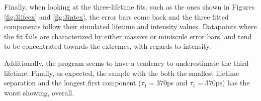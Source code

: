 Finally, when looking at the three-lifetime fits, such as the ones shown in Figures \ref{fig:3lifeex} and \ref{fig:3intex}, the error bars come back and the three fitted components follow their simulated lifetime and intensity values. Datapoints where the fit fails are characterized by either massive or miniscule error bars, and tend to be concentrated towards the extremes, with regards to intensity. 

Additionally, the program seems to have a tendency to underestimate the third lifetime. Finally, as expected, the sample with the both the smallest lifetime separation and the longest first component ($\tau_1=370$ps and $\tau_1=370$ps) has the worst showing, overall.